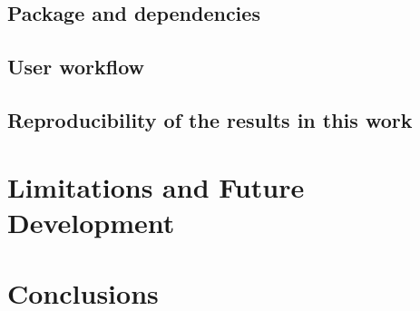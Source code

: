 \documentclass[11pt]{article}
\begin{document}
\subsection{Package and dependencies}


\subsection{User workflow}


\subsection{Reproducibility of the results in this work}


\section{Limitations and Future Development}
\label{sec:limitations}


\section{Conclusions}
\label{sec:conclusions}

\end{document}
